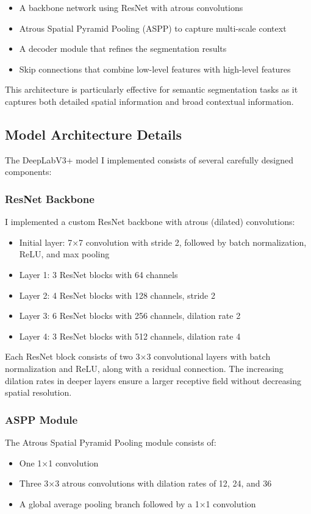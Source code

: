 \documentclass[]{article}
\begin{document}
\begin{itemize}
    \item A backbone network using ResNet with atrous convolutions
    \item Atrous Spatial Pyramid Pooling (ASPP) to capture multi-scale context
    \item A decoder module that refines the segmentation results
    \item Skip connections that combine low-level features with high-level features
\end{itemize}

This architecture is particularly effective for semantic segmentation tasks as it captures both detailed spatial information and broad contextual information.

\subsection{Model Architecture Details}
The DeepLabV3+ model I implemented consists of several carefully designed components:

\subsubsection{ResNet Backbone}
I implemented a custom ResNet backbone with atrous (dilated) convolutions:
\begin{itemize}
    \item Initial layer: 7×7 convolution with stride 2, followed by batch normalization, ReLU, and max pooling
    \item Layer 1: 3 ResNet blocks with 64 channels
    \item Layer 2: 4 ResNet blocks with 128 channels, stride 2
    \item Layer 3: 6 ResNet blocks with 256 channels, dilation rate 2
    \item Layer 4: 3 ResNet blocks with 512 channels, dilation rate 4
\end{itemize}

Each ResNet block consists of two 3×3 convolutional layers with batch normalization and ReLU, along with a residual connection. The increasing dilation rates in deeper layers ensure a larger receptive field without decreasing spatial resolution.

\subsubsection{ASPP Module}
The Atrous Spatial Pyramid Pooling module consists of:
\begin{itemize}
    \item One 1×1 convolution
    \item Three 3×3 atrous convolutions with dilation rates of 12, 24, and 36
    \item A global average pooling branch followed by a 1×1 convolution
\end{itemize}
\end{document}
